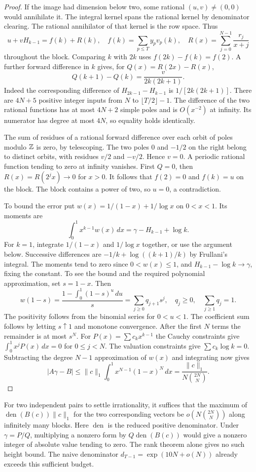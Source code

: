 \documentclass[11pt,a4paper]{article}
\theoremstyle{definition}\newtheorem{definition}[theorem]{Definition}\newtheorem{example}[theorem]{Example}
\theoremstyle{remark}\newtheorem{remark}[theorem]{Remark}
\begin{document}
\begin{proof}
If the image had dimension below two, some rational $(u,v)\ne(0,0)$ would annihilate it. The integral kernel spans the rational kernel by denominator clearing. The rational annihilator of that kernel is the row space. Thus
\[
 u+vH_{k-1}=f(k)+R(k),\quad
 f(k)=\sum_{p\le T}y_pv_p(k),\quad R(x)=\sum_{j=0}^{N-1}\frac{r_j}{x+j}
\]
throughout the block. Comparing $k$ with $2k$ uses $f(2k)-f(k)=f(2)$. A further forward difference in $k$ gives, for $Q(x)=R(2x)-R(x)$,
\[
 Q(k+1)-Q(k)=\frac{v}{2k(2k+1)}.
\]
Indeed the corresponding difference of $H_{2k-1}-H_{k-1}$ is $1/[2k(2k+1)]$. There are $4N+5$ positive integer inputs from $N$ to $\lfloor T/2\rfloor-1$. The difference of the two rational functions has at most $4N+2$ simple poles and is $O(x^{-2})$ at infinity. Its numerator has degree at most $4N$, so equality holds identically.

The sum of residues of a rational forward difference over each orbit of poles modulo $\mathbb Z$ is zero, by telescoping. The two poles $0$ and $-1/2$ on the right belong to distinct orbits, with residues $v/2$ and $-v/2$. Hence $v=0$. A periodic rational function tending to zero at infinity vanishes. First $Q=0$, then $R(x)=R(2^j x)\to0$ for $x>0$. It follows that $f(2)=0$ and $f(k)=u$ on the block. The block contains a power of two, so $u=0$, a contradiction.

To bound the error put $w(x)=1/(1-x)+1/\log x$ on $0<x<1$. Its moments are
\[
 \int_0^1 x^{k-1}w(x)\,dx=\gamma-H_{k-1}+\log k .
\]
For $k=1$, integrate $1/(1-x)$ and $1/\log x$ together, or use the argument below. Successive differences are $-1/k+\log((k+1)/k)$ by Frullani's integral. The moments tend to zero since $0<w(x)\le1$, and $H_{k-1}-\log k\to\gamma$, fixing the constant. To see the bound and the required polynomial approximation, set $s=1-x$. Then
\[
 w(1-s)=\frac{1-\int_0^1(1-s)^u\,du}{s}
        =\sum_{j\ge0}q_{j+1}s^j,\quad
 q_j\ge0,\quad\sum_{j\ge1}q_j=1 .
\]
The positivity follows from the binomial series for $0<u<1$. The coefficient sum follows by letting $s\uparrow1$ and monotone convergence. After the first $N$ terms the remainder is at most $s^N$. For $P(x)=\sum c_kx^{k-1}$ the Cauchy constraints give $\int_0^1x^jP(x)\,dx=0$ for $0\le j<N$. The valuation constraints give $\sum c_k\log k=0$. Subtracting the degree $N-1$ approximation of $w(x)$ and integrating now gives
\[
 |A\gamma-B|\le\|c\|_1\int_0^1x^{N-1}(1-x)^N\,dx
 =\frac{\|c\|_1}{N\binom{2N}{N}} .
\]
\end{proof}
For two independent pairs to settle irrationality, it suffices that the maximum of $\operatorname{den}(B(c))\|c\|_1$ for the two corresponding vectors be $o(N\binom{2N}{N})$ along infinitely many blocks. Here $\operatorname{den}$ is the reduced positive denominator. Under $\gamma=P/Q$, multiplying a nonzero form by $Q\operatorname{den}(B(c))$ would give a nonzero integer of absolute value tending to zero. The rank theorem alone gives no such height bound. The naive denominator $d_{T-1}=\exp(10N+o(N))$ already exceeds this sufficient budget.
\end{document}
